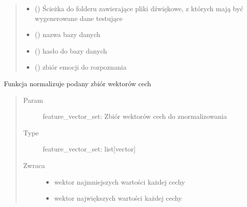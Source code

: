 \documentclass[letterpaper,10pt,polish]{sphinxmanual}
\begin{document}
\begin{fulllineitems}
\begin{quote}
\begin{description}
\begin{itemize}
\item {} 
 () \textendash{} Ścieżka do folderu zawierające pliki dźwiękowe, z których mają
być wygenerowane dane testujące

\item {} 
 () \textendash{} nazwa bazy danych

\item {} 
 () \textendash{} hasło do bazy danych

\item {} 
 () \textendash{} zbiór emocji do rozpoznania

\end{itemize}

\end{description}\end{quote}

\end{fulllineitems}


\begin{fulllineitems}
\label{\detokenize{hmm_main:hmm_main.hmm_normalize}}
Funkcja normalizuje podany zbiór wektorów cech
\begin{quote}\begin{description}
\item[{Param}] \leavevmode
feature\_vector\_set: Zbiór wektorów cech do znormalizowania

\item[{Type}] \leavevmode
feature\_vector\_set: list{[}vector{]}

\item[{Zwraca}] \leavevmode
\begin{itemize}
\item {} 
wektor najmniejszych wartości każdej cechy

\item {} 
wektor największych wartości każdej cechy

\end{itemize}


\end{description}\end{quote}

\end{fulllineitems}
\end{document}
